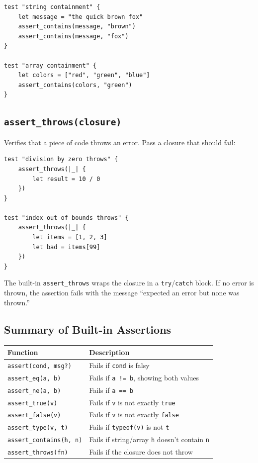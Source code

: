 \begin{lstlisting}[language=Lattice, caption={Containment assertions}]
test "string containment" {
    let message = "the quick brown fox"
    assert_contains(message, "brown")
    assert_contains(message, "fox")
}

test "array containment" {
    let colors = ["red", "green", "blue"]
    assert_contains(colors, "green")
}
\end{lstlisting}

\subsection{\texttt{assert\_throws(closure)}}\label{sec:assert-throws}

Verifies that a piece of code throws an error.
Pass a closure that should fail:

\begin{lstlisting}[language=Lattice, caption={Asserting that code throws an error}]
test "division by zero throws" {
    assert_throws(|_| {
        let result = 10 / 0
    })
}

test "index out of bounds throws" {
    assert_throws(|_| {
        let items = [1, 2, 3]
        let bad = items[99]
    })
}
\end{lstlisting}

The built-in \lstinline|assert_throws| wraps the closure in a \lstinline|try|/\lstinline|catch| block.
If no error is thrown, the assertion fails with the message ``expected an error but none was thrown.''

\subsection{Summary of Built-in Assertions}\label{sec:assert-summary}

\begin{longtable}{@{}lp{8cm}@{}}
\toprule
\textbf{Function} & \textbf{Description} \\
\midrule
\endhead
\lstinline|assert(cond, msg?)| & Fails if \lstinline|cond| is falsy \\
\lstinline|assert_eq(a, b)| & Fails if \lstinline|a != b|, showing both values \\
\lstinline|assert_ne(a, b)| & Fails if \lstinline|a == b| \\
\lstinline|assert_true(v)| & Fails if \lstinline|v| is not exactly \lstinline|true| \\
\lstinline|assert_false(v)| & Fails if \lstinline|v| is not exactly \lstinline|false| \\
\lstinline|assert_type(v, t)| & Fails if \lstinline|typeof(v)| is not \lstinline|t| \\
\lstinline|assert_contains(h, n)| & Fails if string/array \lstinline|h| doesn't contain \lstinline|n| \\
\lstinline|assert_throws(fn)| & Fails if the closure does not throw \\
\bottomrule
\end{longtable}

